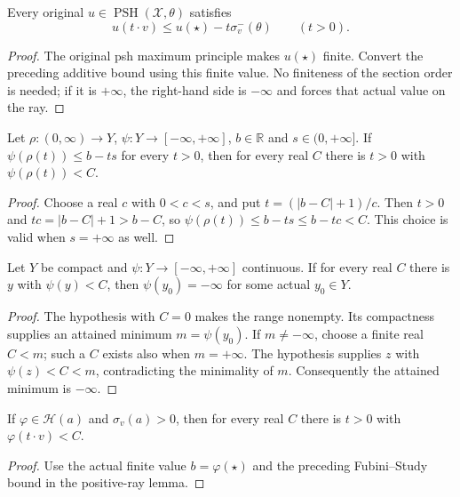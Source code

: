 \begin{theorem}
\label{thm:fp-psh-ray}
\leanok
{}
Every original $u\in\operatorname{PSH}(\mathcal X,\theta)$ satisfies
\[
 u(t\cdot v)\le u(\star)-t\sigma^-_v(\theta)\qquad(t>0).
\]
\end{theorem}
\begin{proof}
The original psh maximum principle makes $u(\star)$ finite.
Convert the preceding additive bound using this finite value.
No finiteness of the section order is needed; if it is $+\infty$,
the right-hand side is $-\infty$ and forces that actual value on the ray.
\end{proof}

\begin{lemma}
\label{lem:fp-positive-ray-decay}
\leanok
Let $\rho:(0,\infty)\to Y$, $\psi:Y\to[-\infty,+\infty]$,
$b\in\mathbb R$ and $s\in(0,+\infty]$.  If
$\psi(\rho(t))\le b-ts$ for every $t>0$, then for every real $C$
there is $t>0$ with $\psi(\rho(t))<C$.
\end{lemma}
\begin{proof}
Choose a real $c$ with $0<c<s$, and put
$t=(|b-C|+1)/c$.  Then $t>0$ and $tc=|b-C|+1>b-C$, so
$\psi(\rho(t))\le b-ts\le b-tc<C$.  This choice is valid when
$s=+\infty$ as well.
\end{proof}

\begin{lemma}
\label{lem:fp-compact-continuous-pole}
\leanok
Let $Y$ be compact and $\psi:Y\to[-\infty,+\infty]$ continuous.
If for every real $C$ there is $y$ with $\psi(y)<C$, then
$\psi(y_0)=-\infty$ for some actual $y_0\in Y$.
\end{lemma}
\begin{proof}
The hypothesis with $C=0$ makes the range nonempty.  Its compactness
supplies an attained minimum $m=\psi(y_0)$.  If $m\ne-\infty$,
choose a finite real $C<m$; such a $C$ exists also when $m=+\infty$.
The hypothesis supplies $z$ with $\psi(z)<C<m$, contradicting the
minimality of $m$.  Consequently the attained minimum is $-\infty$.
\end{proof}

\begin{corollary}
\label{cor:fp-fs-ray-decay}
\leanok
{}
If $\varphi\in\mathcal H(a)$ and $\sigma_v(a)>0$, then for every
real $C$ there is $t>0$ with $\varphi(t\cdot v)<C$.
\end{corollary}
\begin{proof}
Use the actual finite value $b=\varphi(\star)$ and the preceding
Fubini--Study bound in the positive-ray lemma.
\end{proof}

